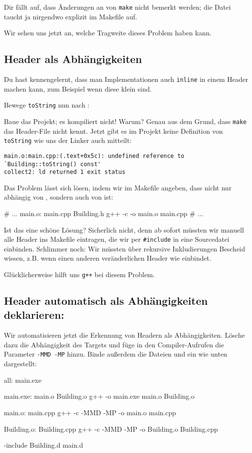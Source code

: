 Dir fällt auf, dass Änderungen an  von \texttt{make} nicht bemerkt werden; die Datei taucht ja nirgendwo explizit im Makefile auf.

Wir sehen uns jetzt an, welche Tragweite dieses Problem haben kann.

\subsection{Header als Abhängigkeiten}
Du hast kennengelernt, dass man Implementationen auch \texttt{inline} in einem Header machen kann, zum Beispiel wenn diese klein sind.

Bewege \lstinline{toString} nun nach :


Baue das Projekt; es kompiliert nicht! Warum? Genau aus dem Grund, dass \texttt{make} das Header-File nicht \glqq kennt\grqq{}.
Jetzt gibt es im Projekt keine Definition von \lstinline{toString} wie uns der Linker auch mitteilt:
\begin{verbatim}
main.o:main.cpp:(.text+0x5c): undefined reference to `Building::toString() const'
collect2: ld returned 1 exit status
\end{verbatim}

Das Problem lässt sich lösen, indem wir im Makefile angeben, dass  nicht nur abhängig von , sondern auch von  ist:
\begin{lstmake}
# ...
main.o: main.cpp Building.h
    g++ -c -o main.o main.cpp
# ...
\end{lstmake}

Ist das eine schöne Lösung?
Sicherlich nicht, denn ab sofort müssten wir manuell alle Header ins Makefile eintragen, die wir per \lstinline{#include} in eine Sourcedatei einbinden.
Schlimmer noch: Wir müssten über rekursive Inkludierungen Bescheid wissen, z.B. wenn  einen anderen veränderlichen Header wie  einbindet.

Glücklicherweise hilft uns \texttt{g++} bei diesem Problem.

\subsection{Header automatisch als Abhängigkeiten deklarieren:}

Wir automatisieren jetzt die Erkennung von Headern als Abhängigkeiten.
Lösche dazu die Abhängigkeit  des Targets  und füge in den Compiler-Aufrufen die Parameter \texttt{-MMD -MP} hinzu.
Binde außerdem die Dateien  und  ein wie unten dargestellt:
\begin{lstmake}
all: main.exe

main.exe: main.o Building.o
    g++ -o main.exe main.o Building.o

main.o: main.cpp
    g++ -c -MMD -MP -o main.o main.cpp

Building.o: Building.cpp
    g++ -c -MMD -MP -o Building.o Building.cpp

-include Building.d main.d
\end{lstmake}

